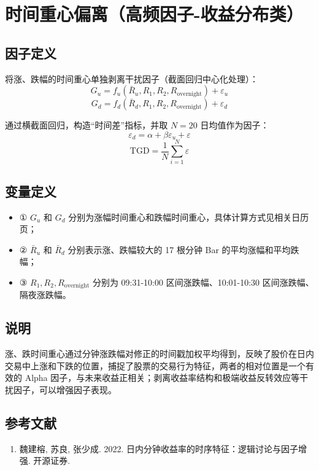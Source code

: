 \documentclass{article}
\begin{document}
\section{时间重心偏离（高频因子-收益分布类）}

\subsection{因子定义}
将涨、跌幅的时间重心单独剥离干扰因子（截面回归中心化处理）：
\begin{equation}
    G_u = f_u(\bar{R}_u, R_1, R_2, R_{\mathrm{overnight}}) + \varepsilon_u
\end{equation}
\begin{equation}
    G_d = f_d(\bar{R}_d, R_1, R_2, R_{\mathrm{overnight}}) + \varepsilon_d
\end{equation}

通过横截面回归，构造“时间差”指标，并取 \( N=20 \) 日均值作为因子：
\begin{equation}
    \varepsilon_d = \alpha + \beta \varepsilon_u + \varepsilon
\end{equation}
\begin{equation}
    \mathrm{TGD} = \frac{1}{N} \sum_{i=1}^N \varepsilon
\end{equation}

\subsection{变量定义}
\begin{itemize}
    \item ① \( G_u \) 和 \( G_d \) 分别为涨幅时间重心和跌幅时间重心，具体计算方式见相关日历页；
    \item ② \( \bar{R}_u \) 和 \( \bar{R}_d \) 分别表示涨、跌幅较大的 17 根分钟 Bar 的平均涨幅和平均跌幅；
    \item ③ \( R_1, R_2, R_{\mathrm{overnight}} \) 分别为 09:31-10:00 区间涨跌幅、10:01-10:30 区间涨跌幅、隔夜涨跌幅。
\end{itemize}

\subsection{说明}
涨、跌时间重心通过分钟涨跌幅对修正的时间戳加权平均得到，反映了股价在日内交易中上涨和下跌的位置，捕捉了股票的交易行为特征，两者的相对位置是一个有效的 Alpha 因子，与未来收益正相关；剥离收益率结构和极端收益反转效应等干扰因子，可以增强因子表现。

\subsection{参考文献}
\begin{enumerate}
    \item 魏建榕, 苏良, 张少成. 2022. 日内分钟收益率的时序特征：逻辑讨论与因子增强. 开源证券.
\end{enumerate}
\end{document}
